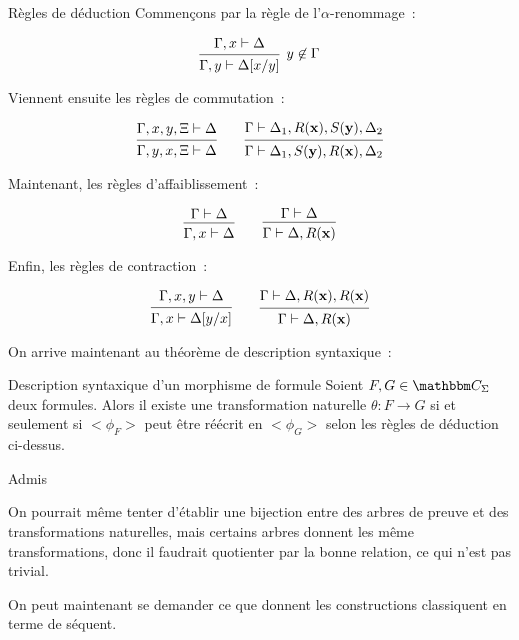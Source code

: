 \begin{defi}{Règles de déduction}
    Commençons par la règle de l'$\alpha$-renommage~:

    \[ \tproof{ \hypo{\Gamma, x\vdash \Delta}
         \infer1[$y\not\in\Gamma$]{\Gamma, y\vdash \Delta[x/y]} }\]

    Viennent ensuite les règles de commutation~:

    \[ \tproof{ \hypo{\Gamma, x, y, \Xi\vdash \Delta}
         \infer1{\Gamma, y, x, \Xi\vdash \Delta} }
       \qquad
       \tproof{ \hypo{\Gamma\vdash \Delta_1, R(\mathbf{x}), S(\mathbf{y}), \Delta_2}
         \infer1{\Gamma\vdash \Delta_1, S(\mathbf{y}), R(\mathbf{x}), \Delta_2} }
    \]

    Maintenant, les règles d'affaiblissement~:

    \[ \tproof{ \hypo{\Gamma\vdash\Delta}
         \infer1{\Gamma, x\vdash \Delta} }
       \qquad
       \tproof{ \hypo{\Gamma\vdash\Delta}
         \infer1{\Gamma\vdash\Delta,R(\mathbf{x})} }\]

    Enfin, les règles de contraction~:

    \[ \tproof{ \hypo{\Gamma,x,y\vdash\Delta}
         \infer1{\Gamma, x\vdash\Delta[y/x]} }
       \qquad
       \tproof{ \hypo{\Gamma\vdash\Delta, R(\mathbf{x}), R(\mathbf{x})}
         \infer1{\Gamma\vdash\Delta, R(\mathbf{x})} }\]

\end{defi}

On arrive maintenant au théorème de description syntaxique~:

\begin{theo}{Description syntaxique d'un morphisme de formule}
    Soient $F,G\in\C_\Sigma$ deux formules. Alors il existe une transformation
    naturelle $\theta:F\rightarrow G$ si et seulement si $<\phi_F>$ peut être réécrit
    en $<\phi_G>$ selon les règles de déduction ci-dessus.
\end{theo}

\begin{pv}
    Admis
\end{pv}

\begin{rem}
    On pourrait même tenter d'établir une bijection entre des arbres de preuve
    et des transformations naturelles, mais certains arbres donnent les même
    transformations, donc il faudrait quotienter par la bonne relation, ce qui
    n'est pas trivial.
\end{rem}

On peut maintenant se demander ce que donnent les constructions classiquent en terme
de séquent.

